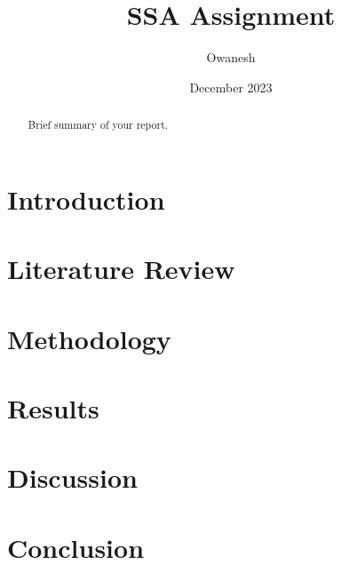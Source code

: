 \documentclass{article}
\title{SSA Assignment}
\author{Owanesh}
\date{December 2023}
\begin{document}
\maketitle

\begin{abstract}
    Brief summary of your report.
\end{abstract}

\tableofcontents

\section{Introduction}
    \lipsum[1]  %

\section{Literature Review}
    \lipsum[2]  %
    

\section{Methodology}
    \lipsum[3]  %

\section{Results}
    \lipsum[4]  %

\section{Discussion}
    \lipsum[5]  %

\section{Conclusion}
    \lipsum[6]  %

\printbibliography
\end{document}
